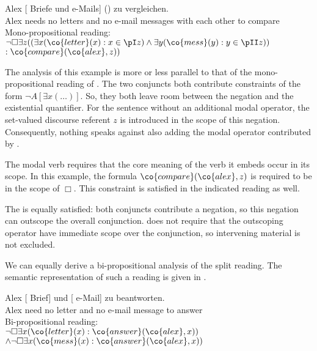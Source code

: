 \documentclass[output=paper]{langsci/langscibook}
\begin{document}
\ea \label{brauch-brief-mail}
\begin{xlist}
\ex 
\gll Alex  [ Briefe und  e-Mails] () zu vergleichen.\\
Alex needs \hphantom{[}no letters and no {e-mail messages} {with each other} to compare\\
\ex Mono-propositional reading:\\
$\lnot \Box \exists z ((
\exists x (\co{letter}(x) : x \in \pI z)
\land \exists y (\co{mess}(y) : y \in \pII z))$\\
\hspace*{\fill}$: \co{compare}(\co{alex},z)
)$
\end{xlist}
\z 

The analysis of this example is more or less parallel to that of the mono-propo\-si\-tional reading of . The two conjuncts both contribute constraints of the form $\lnot A [\exists x (\ldots)]$. 
So, they both leave room between the negation and the existential quantifier. For the sentence without an additional modal operator, the set-valued discourse referent $z$ is introduced in the scope of this negation.
Consequently, nothing speaks against also adding the modal operator contributed by .

The modal verb  requires that the core meaning of the verb it embeds occur in its scope. In this example, the formula $\co{compare}(\co{alex},z)$ is required to be in the scope of $\Box$. This constraint is satisfied in the indicated reading as well. 

The \SemATB{} is equally satisfied: both conjuncts contribute a negation, so this negation can outscope the overall conjunction. \SemATB{} does not require that the outscoping operator have immediate scope over the conjunction, so intervening material is not excluded.

We can equally derive a bi-propositional analysis of the split reading. 
The semantic representation of such a reading is given in .\largerpage[-1]

\ea \label{brauch-brief-mail-bi}
\begin{xlist}
\ex 
\gll Alex  [ Brief] und [ e-Mail] zu beantworten.\\
Alex need \hphantom{[}no letter and \hphantom{[}no {e-mail message} to answer\\
\glt {}
\ex 
Bi-propositional reading:\\
$\lnot \Box \exists x (\co{letter}(x) : \co{answer}(\co{alex}, x))$\\
\hspace*{\fill}$\land 
\lnot \Box \exists x (\co{mess}(x) : \co{answer}(\co{alex}, x)) 
$
\end{xlist}
\z 
\end{document}
